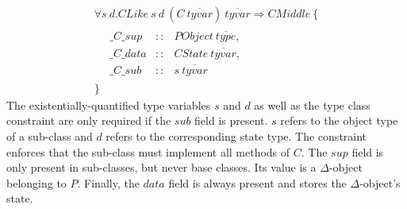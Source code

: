 \begin{displaymath}
\begin{array}{l}
\forall s~d.\mathit{CLike}~s~d~(\mathit{C}~\overline{\mathit{tyvar}})~\overline{\mathit{tyvar}} \Rightarrow \mathit{CMiddle}~\{\\
\quad \begin{array}{lcl}
\_\mathit{C}\_\mathit{sup}  & :: & \mathit{PObject}~\overline{\mathit{type}}, \\
\_\mathit{C}\_\mathit{data} & :: & \mathit{CState}~\overline{\mathit{tyvar}}, \\
\_\mathit{C}\_\mathit{sub}  & :: & s~\overline{\mathit{tyvar}}
\end{array}\\
\}
\end{array}
\end{displaymath}
The existentially-quantified type variables $s$ and $d$ as well as the type class constraint are only required if the $\mathit{sub}$ field is present. $s$ refers to the object type of a sub-class and $d$ refers to the corresponding state type. The constraint enforces that the sub-class must implement all methods of $C$. The $\mathit{sup}$ field is only present in sub-classes, but never base classes. Its value is a $\Delta$-object belonging to $P$. Finally, the $\mathit{data}$ field is always present and stores the $\Delta$-object's state.


